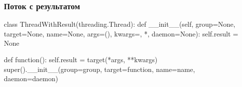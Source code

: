 \documentclass{beamer}
\begin{document}
\begin{frame}[fragile]
\frametitle{Поток с результатом}
\begin{pythoncode}
class ThreadWithResult(threading.Thread):
    def __init__(self, group=None, target=None, name=None,
                 args=(), kwargs={}, *, daemon=None):
        self.result = None

        def function():
            self.result = target(*args, **kwargs)
        super().__init__(group=group, target=function,
                         name=name, daemon=daemon)
\end{pythoncode}

\end{frame}
\end{document}
